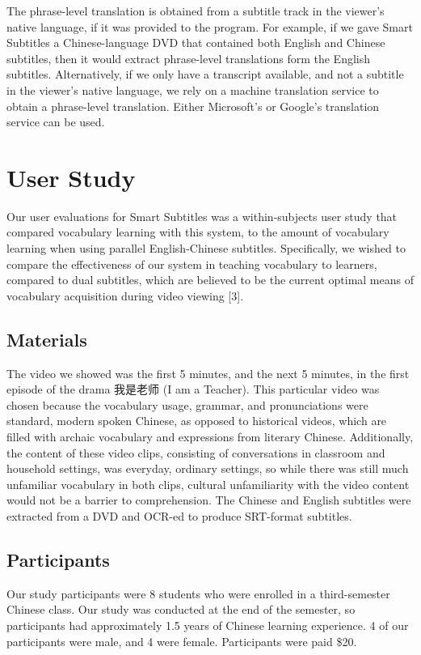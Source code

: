 \documentclass{sigchi}
\begin{document}
The phrase-level translation is obtained from a subtitle track in the viewer's native language, if it was provided to 
the program. For example, if we gave Smart Subtitles a Chinese-language DVD
that contained both English and Chinese subtitles, then it would
extract phrase-level translations form the English subtitles.
Alternatively, if we only have a transcript available, and not a subtitle in the viewer's native language, we rely on a machine translation service to obtain a phrase-level translation. Either Microsoft's or Google's translation service can be used.

\section{User Study}

Our user evaluations for Smart Subtitles was a within-subjects user study that compared vocabulary learning with this system, to the amount of vocabulary learning when using parallel English-Chinese subtitles. Specifically, we wished to compare the effectiveness of our system in teaching vocabulary to learners, compared to dual subtitles, which are believed to be the current optimal means of vocabulary acquisition during video viewing [3].

\subsection{Materials}

The video we showed was the first 5 minutes, and the next 5 minutes, in the first episode of the drama 我是老师 (I am a Teacher). This particular video was chosen because the vocabulary usage, grammar, and pronunciations were standard, modern spoken Chinese, as opposed to historical videos, which are filled with archaic vocabulary and expressions from literary Chinese. Additionally, the content of these video clips, consisting of conversations in classroom and household settings, was everyday, ordinary settings, so while there was still much unfamiliar vocabulary in both clips, cultural unfamiliarity with the video content would not be a barrier to comprehension. The Chinese and English subtitles were extracted from a DVD and OCR-ed to produce SRT-format subtitles.

\subsection{Participants}

Our study participants were 8 students who were enrolled in a third-semester Chinese class. Our study was conducted at the end of the semester, so participants had approximately 1.5 years of Chinese learning experience. 4 of our participants were male, and 4 were female.
Participants were paid \$20.
\end{document}

